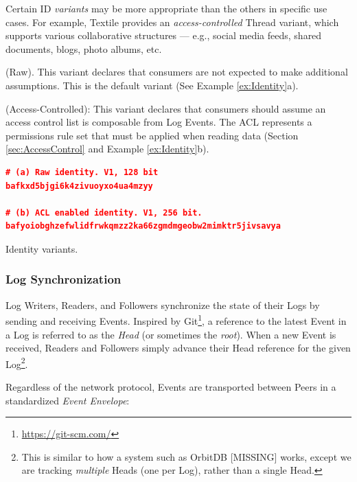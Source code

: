 \documentclass{textile}
\begin{document}
Certain ID \emph{variants} may be more appropriate than the others in specific use cases. For example, Textile provides an \emph{access-controlled} Thread variant, which supports various collaborative structures --- e.g., social media feeds, shared documents, blogs, photo albums, etc.

\begin{definition}
(Raw). This variant declares that consumers are not expected to make additional assumptions. This is the default variant (See Example \ref{ex:Identity}a).
\end{definition}

\begin{definition}
(Access-Controlled): This variant declares that consumers should assume an access control list is composable from Log Events. The ACL represents a permissions rule set that must be applied when reading data (Section  \ref{sec:AccessControl} and Example \ref{ex:Identity}b).
\end{definition}

\begin{example}[hb]
\centering
\begin{minipage}{0.6\textwidth}
\begin{lstlisting}[language=json,firstnumber=1]
# (a) Raw identity. V1, 128 bit
bafkxd5bjgi6k4zivuoyxo4ua4mzyy

# (b) ACL enabled identity. V1, 256 bit.
bafyoiobghzefwlidfrwkqmzz2ka66zgmdmgeobw2mimktr5jivsavya
\end{lstlisting}
\end{minipage}
  \caption{Identity variants.}
  \label{ex:Identity}
\end{example}

\subsubsection{Log Synchronization} \label{sec:LogSync}

Log Writers, Readers, and Followers synchronize the state of their Logs by sending and receiving Events. Inspired by Git\footnote{\url{https://git-scm.com/}}, a reference to the latest Event in a Log is referred to as the \emph{Head} (or sometimes the \emph{root}). When a new Event is received, Readers and Followers simply advance their Head reference for the given Log\footnote{This is similar to how a system such as OrbitDB [MISSING] works, except we are tracking \emph{multiple} Heads (one per Log), rather than a single Head.}.

Regardless of the network protocol, Events are transported between Peers in a standardized \emph{Event Envelope}:
\end{document}

